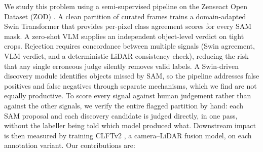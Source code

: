 \documentclass[conference]{IEEEtran}
\begin{document}
We study this problem using a semi-supervised pipeline on the Zenseact Open Dataset (ZOD) \cite{alibeigi2023zod}.
A clean partition of curated frames trains a domain-adapted Swin Transformer \cite{liu2021swin} that provides per-pixel class agreement scores for every SAM mask.
A zero-shot VLM supplies an independent object-level verdict on tight crops.
Rejection requires concordance between multiple signals (Swin agreement, VLM verdict, and a deterministic LiDAR consistency check), reducing the risk that any single erroneous judge silently removes valid labels.
A Swin-driven discovery module identifies objects missed by SAM, so the pipeline addresses false positives and false negatives through separate mechanisms, which we find are not equally productive.
To score every signal against human judgement rather than against the other signals, we verify the entire flagged partition by hand: each SAM proposal and each discovery candidate is judged directly, in one pass, without the labeller being told which model produced what.
Downstream impact is then measured by training CLFTv2 \cite{gu2024clft}, a camera–LiDAR fusion model, on each annotation variant.
Our contributions are:
\end{document}
